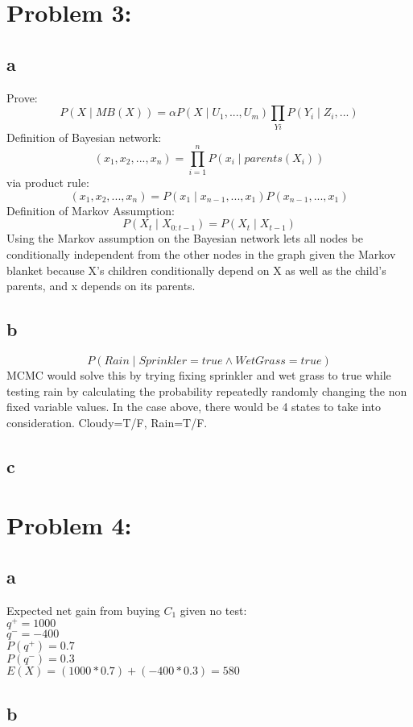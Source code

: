 \documentclass[11pt, oneside]{article}   	%
\begin{document}
\begin{flushleft}
\section*{Problem 3:}
\subsection*{a}
Prove:
$$P(X \mid MB(X)) = \alpha P(X \mid U_{1}, ..., U_{m}) \prod_{Yi} P(Y_{i} \mid Z_{i}, ...)$$
Definition of Bayesian network:
$$(x_{1},x_{2},...,x_{n})=\prod_{i=1}^{n} P(x_{i} \mid parents(X_{i}))$$
via product rule:
$$(x_{1},x_{2},...,x_{n})=P(x_{1} \mid x_{n-1}, ..., x_{1})P(x_{n-1},...,x_{1})$$
Definition of Markov Assumption:
$$P(X_{t} \mid X_{0:t-1}) = P(X_{t} \mid X_{t-1})$$
Using the Markov assumption on the Bayesian network lets all nodes be conditionally independent from the other nodes in the graph given the Markov blanket because X's children  conditionally depend on X as well as the child's parents, and x depends on its parents.
\subsection*{b}
$$P(Rain \mid Sprinkler=true \wedge WetGrass=true)$$
MCMC would solve this by trying fixing sprinkler and wet grass to true while testing rain by calculating the probability repeatedly randomly changing the non fixed variable values. In the case above, there would be 4 states to take into consideration. Cloudy=T/F, Rain=T/F.
\subsection*{c}
\section*{Problem 4:}
\subsection*{a}
Expected net gain from buying $C_1$ given no test:\\
$q^+ = 1000$\\
$q^- = -400$\\
$P(q^+ ) = 0.7$\\
$P(q^- ) = 0.3$\\
$E(X) = (1000*0.7)+(-400*0.3) = 580$\\
\subsection*{b}


\end{flushleft}
\end{document}
